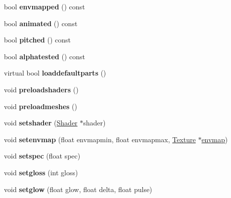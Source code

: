 \begin{DoxyCompactItemize}
bool {\bfseries envmapped} () const
\item 
\mbox{\label{structanimmodel_ad99da445d72fe4fd3410b0f43dd1b320}} 
bool {\bfseries animated} () const
\item 
\mbox{\label{structanimmodel_af4a1ee0f2c2538adcfabaa661e985a8e}} 
bool {\bfseries pitched} () const
\item 
\mbox{\label{structanimmodel_a0a2b25cfbe1b7f6428eb2154c121a213}} 
bool {\bfseries alphatested} () const
\item 
\mbox{\label{structanimmodel_a1e5da2a8ebbdb7df6bc046b335be532b}} 
virtual bool {\bfseries loaddefaultparts} ()
\item 
\mbox{\label{structanimmodel_aaeb99e417a2a13f7fd6314ea8ddee580}} 
void {\bfseries preloadshaders} ()
\item 
\mbox{\label{structanimmodel_a56469b961b6615fb54302057a8822d12}} 
void {\bfseries preloadmeshes} ()
\item 
\mbox{\label{structanimmodel_a16f1da27ad68b0abef99b59099642b39}} 
void {\bfseries setshader} (\hyperlink{struct_shader}{Shader} $\ast$shader)
\item 
\mbox{\label{structanimmodel_ad5bd262a068d21a9c062707709d5c000}} 
void {\bfseries setenvmap} (float envmapmin, float envmapmax, \hyperlink{struct_texture}{Texture} $\ast$\hyperlink{structenvmap}{envmap})
\item 
\mbox{\label{structanimmodel_a38d13767831a8a38197b66bab3385bbd}} 
void {\bfseries setspec} (float spec)
\item 
\mbox{\label{structanimmodel_a97731333f3a91102f4e3a1719050ce19}} 
void {\bfseries setgloss} (int gloss)
\item 
\mbox{\label{structanimmodel_aba40170504ff95a3fcfd5376bec1f4cf}} 
void {\bfseries setglow} (float glow, float delta, float pulse)
\item 
\mbox{\label{structanimmodel_a0bc1ea2c24f576e241060c33595db43f}} 

\end{DoxyCompactItemize}
